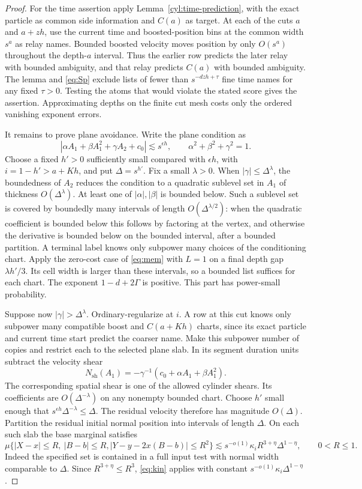 \begin{proof}
For the time assertion apply Lemma~\ref{cyl:time-prediction}, with the
exact particle as common side information and $C(a)$ as target. At each
of the cuts $a$ and $a+zh$, use the current time and boosted-position bins
at the common width $s^a$ as relay names. Bounded boosted velocity moves
position by only $O(s^a)$ throughout the depth-$a$ interval. Thus the
earlier row predicts the later relay with bounded ambiguity, and that
relay predicts $C(a)$ with bounded ambiguity. The lemma and \eqref{eq:Sp}
exclude lists of fewer than $s^{-dzh+\tau}$ fine time names for any
fixed $\tau>0$. Testing the atoms that would violate the stated score
gives the assertion. Approximating depths on the finite cut mesh costs
only the ordered vanishing exponent errors.

It remains to prove plane avoidance. Write the plane condition as
\[
 |\alpha A_1+\beta A_1^2+\gamma A_2+c_0|
 \lesssim s^{\epsilon h},\qquad
 \alpha^2+\beta^2+\gamma^2=1.
\]
Choose a fixed $h'>0$ sufficiently small compared with $\epsilon h$,
with $i=1-h'>a+Kh$, and put $\Delta=s^{h'}$.
Fix a small $\lambda>0$. When $|\gamma|\leq\Delta^\lambda$, the
boundedness of $A_2$ reduces the condition to a quadratic sublevel set
in $A_1$ of thickness $O(\Delta^\lambda)$. At least one of
$|\alpha|,|\beta|$ is bounded below. Such a sublevel set is covered by
boundedly many intervals of length $O(\Delta^{\lambda/2})$: when the
quadratic coefficient is bounded below this follows by factoring at
the vertex, and otherwise the derivative is bounded below on the
bounded interval, after a bounded partition. A terminal label knows
only subpower many choices of the conditioning chart. Apply the
zero-cost case of \eqref{eq:mem} with $L=1$ on a final depth gap
$\lambda h'/3$. Its cell width is larger than these intervals, so a
bounded list suffices for each chart. The exponent
$1-d+2\Gamma$ is positive. This part has power-small probability.

Suppose now $|\gamma|>\Delta^\lambda$. Ordinary-regularize at $i$.
A row at this cut knows only subpower many compatible boost and
$C(a+Kh)$ charts, since its exact particle and current time start
predict the coarser name. Make this subpower number of copies and
restrict each to the selected plane slab. In its segment duration
units subtract the velocity shear
\[
 N_{\mathrm{sh}}(A_1)
 =-\gamma^{-1}(c_0+\alpha A_1+\beta A_1^2).
\]
The corresponding spatial shear is one of the allowed cylinder
shears. Its coefficients are $O(\Delta^{-\lambda})$ on any nonempty
bounded chart. Choose $h'$ small enough that
$s^{\epsilon h}\Delta^{-\lambda}\leq\Delta$.
The residual velocity therefore has magnitude $O(\Delta)$.
Partition the residual initial normal position into intervals of
length $\Delta$. On each such slab the base marginal satisfies
\[
 \mu\{|X-x|\leq R,\ |B-b|\leq R,
             |Y-y-2x(B-b)|\leq R^2\}
 \lesssim s^{-o(1)}\kappa_i R^{3+\eta}\Delta^{1-\eta},
 \qquad 0<R\leq1.
\]
Indeed the specified set is contained in a full input test with
normal width comparable to $\Delta$. Since $R^{3+\eta}\leq R^3$,
\eqref{eq:kin} applies with constant
$s^{-o(1)}\kappa_i\Delta^{1-\eta}$.


\end{proof}
